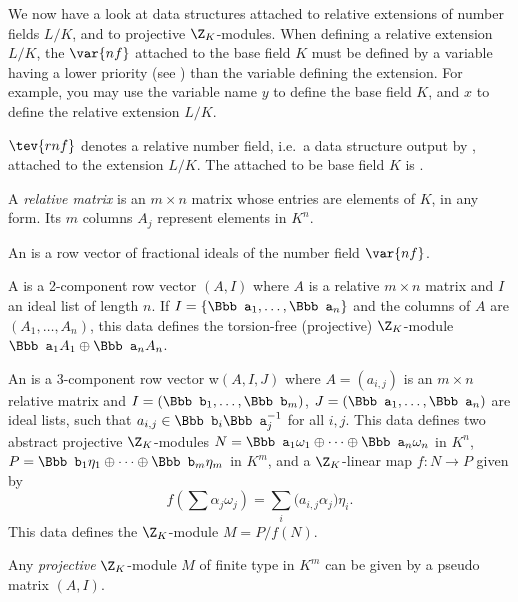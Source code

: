
We now have a look at data structures attached to relative extensions
of number fields $L/K$, and to projective $\Z_K$-modules. When defining a
relative extension $L/K$, the $\var{nf}$ attached to the base field $K$
must be defined by a variable having a lower priority (see
) than the variable defining the extension. For example,
you may use the variable name $y$ to define the base field $K$, and $x$ to
define the relative extension $L/K$.

\label{se:ZKmodules} %

\item $\tev{rnf}$ denotes a relative number field, i.e.~a data structure
output by , attached to the extension $L/K$. The 
attached to be base field $K$ is .

\item A \emph{relative matrix} is an $m\times n$ matrix whose entries are
elements of $K$, in any form. Its $m$ columns $A_j$ represent elements
in $K^n$.

\item An  is a row vector of fractional ideals of the number
field $\var{nf}$.

\item A  is a 2-component row vector $(A,I)$ where $A$
is a relative $m\times n$ matrix and $I$ an ideal list of length $n$. If $I =
\{{\Bbb a}_1,\dots, {\Bbb a}_n\}$ and the columns of $A$ are $(A_1,\dots,
A_n)$, this data defines the torsion-free (projective) $\Z_K$-module ${\Bbb
a}_1 A_1\oplus {\Bbb a}_n A_n$.

\item An  is a 3-component row vector w$(A,I,J)$
where $A = (a_{i,j})$ is an $m\times n$ relative matrix and $I = ({\Bbb
b}_1,\dots, {\Bbb b}_m)$, $J = ({\Bbb a}_1,\dots, {\Bbb a}_n)$ are ideal
lists, such that $a_{i,j} \in {\Bbb b}_i {\Bbb a}_j^{-1}$ for all $i,j$. This
data defines two abstract projective $\Z_K$-modules $N = {\Bbb
a_1}\omega_1\oplus \cdots\oplus {\Bbb a_n}\omega_n $ in $K^n$, $P = {\Bbb
b_1}\eta_1\oplus \cdots\oplus {\Bbb b_m}\eta_m$ in $K^m$, and a $\Z_K$-linear
map $f:N\to P$ given by
$$ f(\sum \alpha_j\omega_j) = \sum_i \Big(a_{i,j}\alpha_j\Big) \eta_i.$$
This data defines the $\Z_K$-module $M = P/f(N)$.

\item Any \emph{projective} $\Z_K$-module $M$
of finite type in $K^m$ can be given by a pseudo matrix $(A,I)$.

